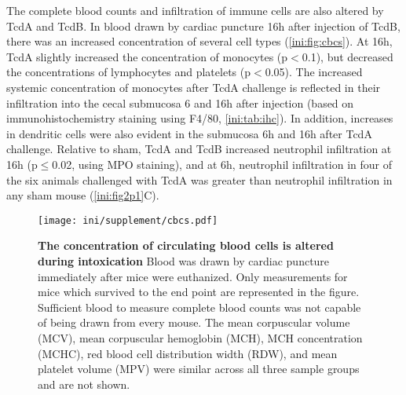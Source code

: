 The complete blood counts and infiltration of immune cells are also altered 
by TcdA and TcdB. In blood drawn by cardiac puncture 16h after injection 
of TcdB, there was an increased concentration of several cell types 
(\autoref{ini:fig:cbcs}). At 16h, TcdA slightly increased the concentration 
of monocytes (p$<$0.1), but decreased the concentrations of lymphocytes 
and platelets (p$<$0.05). The increased systemic concentration of 
monocytes after TcdA challenge is reflected in their infiltration into 
the cecal submucosa 6 and 16h after injection (based on immunohistochemistry 
staining using F4/80, \autoref{ini:tab:ihc}). In addition, increases in 
dendritic cells were also evident in the submucosa 6h and 16h after TcdA 
challenge. Relative to sham, TcdA and TcdB increased neutrophil 
infiltration at 16h (p$\leq$0.02, using MPO staining), and at 6h, 
neutrophil infiltration in four of the six animals challenged with TcdA 
was greater than neutrophil infiltration in any sham mouse (\autoref{ini:fig2p1}C).


\begin{figure}[ht]
\centering
\begin{adjustwidth}{-1cm}{}
\texttt{[image: ini/supplement/cbcs.pdf]}
\end{adjustwidth}
\caption[The concentration of circulating
blood cells was altered during intoxication]
      {\textbf{The concentration of circulating
           blood cells is altered during intoxication}
           Blood was drawn by cardiac puncture immediately after mice were euthanized.
Only measurements for mice which survived to the end point are represented
in the figure. Sufficient blood to measure complete blood counts was not 
capable of being drawn from every mouse. The mean corpuscular volume (MCV), 
mean corpuscular hemoglobin (MCH), MCH concentration (MCHC), red blood
cell distribution width (RDW), and mean platelet volume (MPV) were
similar across all three sample groups and are not shown.
           }
\label{ini:fig:cbcs}
\end{figure}

